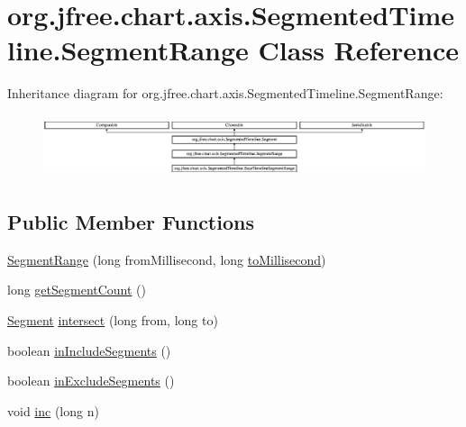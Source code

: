 \hypertarget{classorg_1_1jfree_1_1chart_1_1axis_1_1_segmented_timeline_1_1_segment_range}{}\section{org.\+jfree.\+chart.\+axis.\+Segmented\+Timeline.\+Segment\+Range Class Reference}
\label{classorg_1_1jfree_1_1chart_1_1axis_1_1_segmented_timeline_1_1_segment_range}
Inheritance diagram for org.\+jfree.\+chart.\+axis.\+Segmented\+Timeline.\+Segment\+Range\+:\begin{figure}[H]
\begin{center}
\leavevmode
\includegraphics[height=1.857380cm]{classorg_1_1jfree_1_1chart_1_1axis_1_1_segmented_timeline_1_1_segment_range}
\end{center}
\end{figure}
\subsection*{Public Member Functions}
\begin{DoxyCompactItemize}
\item 
\mbox{\hyperlink{classorg_1_1jfree_1_1chart_1_1axis_1_1_segmented_timeline_1_1_segment_range_a36f8f53d5091e3429b4e81576fbd96e1}{Segment\+Range}} (long from\+Millisecond, long \mbox{\hyperlink{classorg_1_1jfree_1_1chart_1_1axis_1_1_segmented_timeline_a734fc49f503e38b51902dbee8f27c060}{to\+Millisecond}})
\item 
long \mbox{\hyperlink{classorg_1_1jfree_1_1chart_1_1axis_1_1_segmented_timeline_1_1_segment_range_a803917af8abb272eb213973cd6f880b6}{get\+Segment\+Count}} ()
\item 
\mbox{\hyperlink{classorg_1_1jfree_1_1chart_1_1axis_1_1_segmented_timeline_1_1_segment}{Segment}} \mbox{\hyperlink{classorg_1_1jfree_1_1chart_1_1axis_1_1_segmented_timeline_1_1_segment_range_a85cc5245bf9ae97def8129625f405e62}{intersect}} (long from, long to)
\item 
boolean \mbox{\hyperlink{classorg_1_1jfree_1_1chart_1_1axis_1_1_segmented_timeline_1_1_segment_range_a1cdc51f54d87170bcaf9d0935978ead4}{in\+Include\+Segments}} ()
\item 
boolean \mbox{\hyperlink{classorg_1_1jfree_1_1chart_1_1axis_1_1_segmented_timeline_1_1_segment_range_a9a908f7bf6474a7f1b8be99a3d6dfc28}{in\+Exclude\+Segments}} ()
\item 
void \mbox{\hyperlink{classorg_1_1jfree_1_1chart_1_1axis_1_1_segmented_timeline_1_1_segment_range_a56fcc197809e340c53775cafa19a1ae9}{inc}} (long n)
\end{DoxyCompactItemize}
